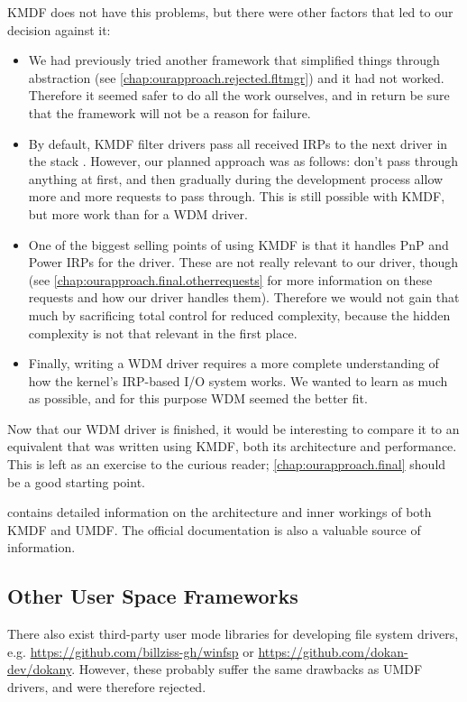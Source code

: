 KMDF does not have this problems, but there were other factors that led to our decision against it:
\begin{itemize}
	\item We had previously tried another framework that simplified things through abstraction (see \autoref{chap:ourapproach.rejected.fltmgr}) and it had not worked. Therefore it seemed safer to do all the work ourselves, and in return be sure that the framework will not be a reason for failure.
	\item By default, KMDF filter drivers pass all received IRPs to the next driver in the stack \cite{Wdf}. However, our planned approach was as follows: don't pass through anything at first, and then gradually during the development process allow more and more requests to pass through. This is still possible with KMDF, but more work than for a WDM driver.
	\item One of the biggest selling points of using KMDF is that it handles PnP and Power IRPs for the driver. These are not really relevant to our driver, though (see \autoref{chap:ourapproach.final.otherrequests} for more information on these requests and how our driver handles them). Therefore we would not gain that much by sacrificing total control for reduced complexity, because the hidden complexity is not that relevant in the first place.
	\item Finally, writing a WDM driver requires a more complete understanding of how the kernel's IRP-based I/O system works. We wanted to learn as much as possible, and for this purpose WDM seemed the better fit.
\end{itemize}

Now that our WDM driver is finished, it would be interesting to compare it to an equivalent that was written using KMDF, both its architecture and performance. This is left as an exercise to the curious reader; \autoref{chap:ourapproach.final} should be a good starting point.

\cite{Yosifovich2017} contains detailed information on the architecture and inner workings of both KMDF and UMDF. The official documentation \cite{Wdf} is also a valuable source of information.

\subsection{Other User Space Frameworks}
\label{chap:ourapproach.rejected.other}
There also exist third-party user mode libraries for developing file system drivers, e.g. \url{https://github.com/billziss-gh/winfsp} or \url{https://github.com/dokan-dev/dokany}. However, these probably suffer the same drawbacks as UMDF drivers, and were therefore rejected.

